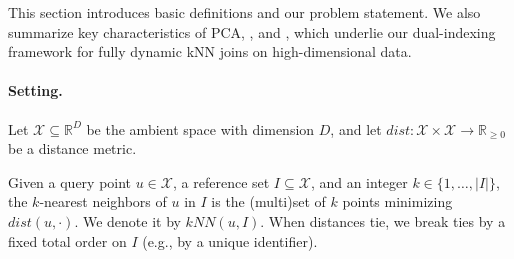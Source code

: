 This section introduces basic definitions and our problem statement. We also summarize key characteristics of PCA, \deltatree, and \hdrtree, which underlie our dual-indexing framework for fully dynamic kNN joins on high-dimensional data.

\paragraph{Setting.}
{\parindent=0pt
Let $\mathcal{X}\subseteq\mathbb{R}^D$ be the ambient space with dimension $D$, and let $dist:\mathcal{X}\times\mathcal{X}\to\mathbb{R}_{\ge 0}$ be a distance metric.
}


\begin{definition}\label{def:knns}
Given a query point $u\in\mathcal{X}$, a reference set $I\subseteq\mathcal{X}$, and an integer $k\in\{1,\dots,|I|\}$,
the $k$-nearest neighbors of $u$ in $I$ is the (multi)set of $k$ points minimizing $dist(u,\cdot)$.
We denote it by $kNN(u,I)$.
When distances tie, we break ties by a fixed total order on $I$ (e.g., by a unique identifier).
\end{definition}

